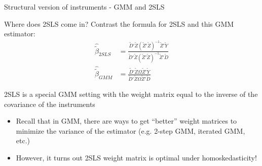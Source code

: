 \documentclass[notes,11pt, aspectratio=169]{beamer}
\newenvironment{wideitemize}{\itemize\addtolength{\itemsep}{10pt}}{\enditemize}
\begin{document}
\begin{frame}{Structural version of instruments - GMM and 2SLS}
  \begin{wideitemize}
  \item Where does 2SLS come in? Contrast the formula for 2SLS and this GMM estimator:
    \begin{align*}
      \hat{\widetilde{\beta}}_{2SLS} &= \frac{\widetilde{D}'\widetilde{Z} (\widetilde{Z}'\widetilde{Z})^{-1} \widetilde{Z}'\widetilde{Y}}{\widetilde{D}'\widetilde{Z} (\widetilde{Z}'\widetilde{Z})^{-1} \widetilde{Z}'\widetilde{D}}\\ 
      \hat{\widetilde{\beta}}_{GMM} &= \frac{\widetilde{D}'\widetilde{Z} \Omega \widetilde{Z}'\widetilde{Y}}{\widetilde{D}'\widetilde{Z} \Omega \widetilde{Z}'\widetilde{D}}
    \end{align*}
  \item 2SLS is a special GMM setting with the weight matrix equal to
    the inverse of the covariance of the instruments
    \begin{itemize}
    \item Recall that in GMM, there are ways to get ``better'' weight
      matrices to minimize the variance of the estimator (e.g. 2-step
      GMM, iterated GMM, etc.)
    \item However, it turns out 2SLS weight matrix is optimal under
      homoskedasticity!
    \end{itemize}
  \end{wideitemize}
\end{frame}
\end{document}
